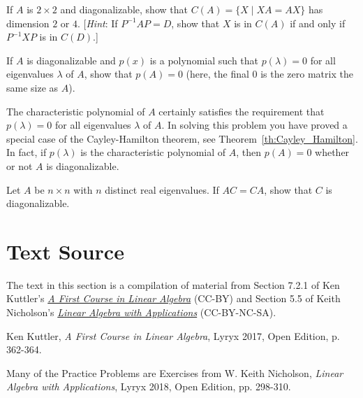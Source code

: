 \documentclass{ximera}
\begin{document}
\begin{problem}
If $A$ is $2 \times 2$ and diagonalizable, show that $C(A) = \{X \mid XA = AX\}$ has dimension $2$ or $4$. [\textit{Hint}: If $P^{-1}AP = D$, show that $X$ is in $C(A)$ if and only if $P^{-1}XP$ is in $C(D)$.]
\end{problem}

\begin{problem}
If $A$ is diagonalizable and $p(x)$ is a polynomial such that $p(\lambda) = 0$ for all eigenvalues $\lambda$ of $A$, show that $p(A) = 0$ (here, the final 0 is the zero matrix the same size as $A$).
\begin{remark}
The characteristic polynomial of $A$ certainly satisfies the requirement that $p(\lambda) = 0$ for all eigenvalues $\lambda$ of $A$.  In solving this problem you have proved a special case of the Cayley-Hamilton theorem, see Theorem~\ref{th:Cayley_Hamilton}.  In fact, if $p(\lambda)$ is the characteristic polynomial of $A$, then $p(A) = 0$ whether or not $A$ is diagonalizable.
\end{remark}
\end{problem}

\begin{problem}
Let $A$ be $n \times n$ with $n$ distinct real eigenvalues. If $AC = CA$, show that $C$ is diagonalizable.
\end{problem}

\section*{Text Source}
The text in this section is a compilation of material from Section 7.2.1 of Ken Kuttler's \href{https://open.umn.edu/opentextbooks/textbooks/a-first-course-in-linear-algebra-2017}{\it A First Course in Linear Algebra} (CC-BY) and Section 5.5 of Keith Nicholson's \href{https://open.umn.edu/opentextbooks/textbooks/linear-algebra-with-applications}{\it Linear Algebra with Applications} (CC-BY-NC-SA).

Ken Kuttler, {\it  A First Course in Linear Algebra}, Lyryx 2017, Open Edition, p. 362-364.

Many of the Practice Problems are Exercises from 
W. Keith Nicholson, {\it Linear Algebra with Applications}, Lyryx 2018, Open Edition, pp. 298-310.
\end{document}
